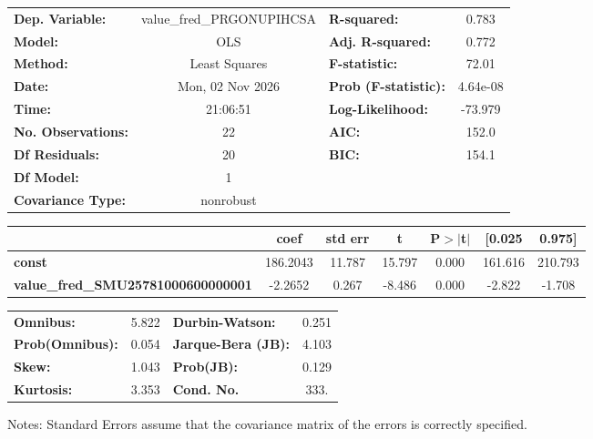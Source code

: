 \begin{center}
\begin{tabular}{lclc}
\toprule
\textbf{Dep. Variable:}                    & value\_fred\_PRGONUPIHCSA & \textbf{  R-squared:         } &     0.783   \\
\textbf{Model:}                            &            OLS            & \textbf{  Adj. R-squared:    } &     0.772   \\
\textbf{Method:}                           &       Least Squares       & \textbf{  F-statistic:       } &     72.01   \\
\textbf{Date:}                             &      Mon, 02 Nov 2026     & \textbf{  Prob (F-statistic):} &  4.64e-08   \\
\textbf{Time:}                             &          21:06:51         & \textbf{  Log-Likelihood:    } &   -73.979   \\
\textbf{No. Observations:}                 &               22          & \textbf{  AIC:               } &     152.0   \\
\textbf{Df Residuals:}                     &               20          & \textbf{  BIC:               } &     154.1   \\
\textbf{Df Model:}                         &                1          & \textbf{                     } &             \\
\textbf{Covariance Type:}                  &         nonrobust         & \textbf{                     } &             \\
\bottomrule
\end{tabular}
\begin{tabular}{lcccccc}
                                           & \textbf{coef} & \textbf{std err} & \textbf{t} & \textbf{P$> |$t$|$} & \textbf{[0.025} & \textbf{0.975]}  \\
\midrule
\textbf{const}                             &     186.2043  &       11.787     &    15.797  &         0.000        &      161.616    &      210.793     \\
\textbf{value\_fred\_SMU25781000600000001} &      -2.2652  &        0.267     &    -8.486  &         0.000        &       -2.822    &       -1.708     \\
\bottomrule
\end{tabular}
\begin{tabular}{lclc}
\textbf{Omnibus:}       &  5.822 & \textbf{  Durbin-Watson:     } &    0.251  \\
\textbf{Prob(Omnibus):} &  0.054 & \textbf{  Jarque-Bera (JB):  } &    4.103  \\
\textbf{Skew:}          &  1.043 & \textbf{  Prob(JB):          } &    0.129  \\
\textbf{Kurtosis:}      &  3.353 & \textbf{  Cond. No.          } &     333.  \\
\bottomrule
\end{tabular}
\end{center}

Notes: \newline
 [1] Standard Errors assume that the covariance matrix of the errors is correctly specified.